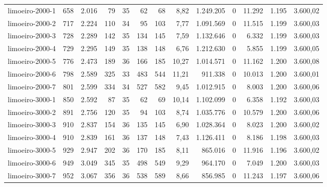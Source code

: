 \begin{table}[ht!]
{\begin{tabular}{lrrrrrrrrrrrr}
			\rowcolor{rowlight}limoeiro-2000-1                                                        & 658 & 2.016 & 79  & 35 & 62  & 68  & 8,82  & 1.249.205 & 0 & 11.292 & 1.195 & 3.600,02 \\
			\rowcolor{rowlight}limoeiro-2000-2                                                        & 717 & 2.224 & 110 & 34 & 95  & 103 & 7,77  & 1.091.569 & 0 & 11.515 & 1.199 & 3.600,03 \\
			\rowcolor{rowlight}limoeiro-2000-3                                                        & 728 & 2.289 & 142 & 35 & 134 & 145 & 7,59  & 1.132.646 & 0 & 6.332  & 1.199 & 3.600,03 \\
			\rowcolor{rowlight}limoeiro-2000-4                                                        & 729 & 2.295 & 149 & 35 & 138 & 148 & 6,76  & 1.212.630 & 0 & 5.855  & 1.199 & 3.600,05 \\
			\rowcolor{rowlight}limoeiro-2000-5                                                        & 776 & 2.473 & 189 & 36 & 166 & 185 & 10,27 & 1.014.571 & 0 & 11.162 & 1.200 & 3.600,08 \\
			\rowcolor{rowlight}limoeiro-2000-6                                                        & 798 & 2.589 & 325 & 33 & 483 & 544 & 11,21 & 911.338   & 0 & 10.013 & 1.200 & 3.600,01 \\
			\rowcolor{rowlight}limoeiro-2000-7                                                        & 801 & 2.599 & 334 & 34 & 527 & 582 & 9,45  & 1.012.915 & 0 & 8.003  & 1.200 & 3.600,06 \\
			\rowcolor{rowlight}limoeiro-3000-1                                                        & 850 & 2.592 & 87  & 35 & 62  & 69  & 10,14 & 1.102.099 & 0 & 6.358  & 1.192 & 3.600,03 \\
			\rowcolor{rowlight}limoeiro-3000-2                                                        & 891 & 2.756 & 120 & 35 & 94  & 103 & 8,74  & 1.035.776 & 0 & 10.579 & 1.200 & 3.600,06 \\
			\rowcolor{rowlight}limoeiro-3000-3                                                        & 910 & 2.837 & 154 & 36 & 135 & 145 & 6,90  & 1.028.364 & 0 & 8.023  & 1.200 & 3.600,02 \\
			\rowcolor{rowlight}limoeiro-3000-4                                                        & 910 & 2.839 & 161 & 36 & 137 & 148 & 7,43  & 1.126.411 & 0 & 8.186  & 1.198 & 3.600,03 \\
			\rowcolor{rowlight}limoeiro-3000-5                                                        & 929 & 2.947 & 202 & 36 & 170 & 185 & 8,11  & 865.016   & 0 & 11.916 & 1.196 & 3.600,02 \\
			\rowcolor{rowlight}limoeiro-3000-6                                                        & 949 & 3.049 & 345 & 35 & 498 & 549 & 9,29  & 964.170   & 0 & 7.049  & 1.200 & 3.600,03 \\
			\rowcolor{rowlight}limoeiro-3000-7                                                        & 952 & 3.067 & 356 & 36 & 538 & 589 & 8,66  & 856.985   & 0 & 11.243 & 1.197 & 3.600,06 \\
			\bottomrule
		\end{tabular}%
	}
\end{table}

